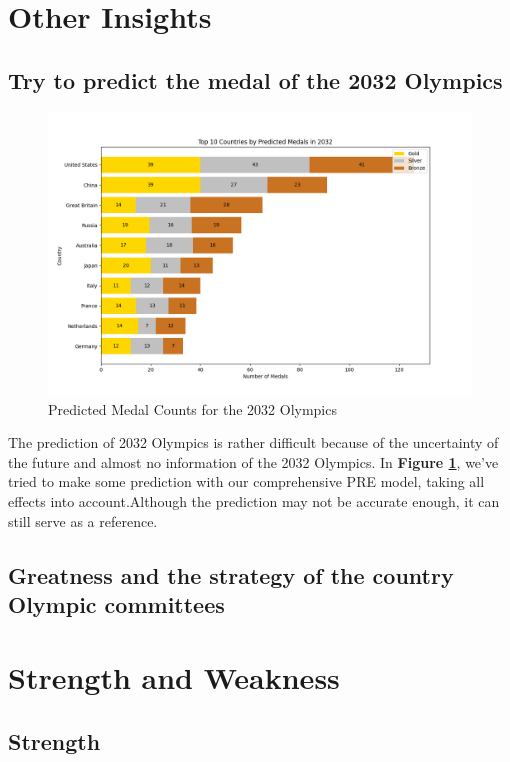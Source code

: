 \section{Other Insights}

\subsection{Try to predict the medal of the 2032 Olympics}

\begin{figure}[h]
\centering
\includegraphics[width=1.1\textwidth]{../figures/2032.png}
\caption{Predicted Medal Counts for the 2032 Olympics}
\label{fig:medal_prediction}
\end{figure}

The prediction of 2032 Olympics is rather difficult because of the uncertainty of the future and almost no information of the 2032 Olympics. In \textbf{Figure \ref{fig:medal_prediction}}, we've tried to make some prediction with our comprehensive PRE model, taking all effects into account.Although the prediction may not be accurate enough, it can still serve as a reference.

\subsection{Greatness and the strategy of the country Olympic committees}


\section{Strength and Weakness}

\subsection{Strength}

